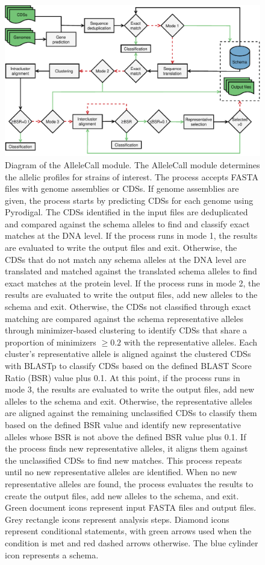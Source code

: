 \newpage
\begin{figure}[h!]
    \centering
    \includegraphics[angle=0,width=\textwidth]{figures/chapter 2/FigureS6.pdf}
    \caption{Diagram of the AlleleCall module. The AlleleCall module determines the allelic profiles for strains of interest. The process accepts FASTA files with genome assemblies or CDSs. If genome assemblies are given, the process starts by predicting CDSs for each genome using Pyrodigal. The CDSs identified in the input files are deduplicated and compared against the schema alleles to find and classify exact matches at the DNA level. If the process runs in mode 1, the results are evaluated to write the output files and exit. Otherwise, the CDSs that do not match any schema alleles at the DNA level are translated and matched against the translated schema alleles to find exact matches at the protein level. If the process runs in mode 2, the results are evaluated to write the output files, add new alleles to the schema and exit. Otherwise, the CDSs not classified through exact matching are compared against the schema representative alleles through minimizer-based clustering to identify CDSs that share a proportion of minimizers $\geq0.2$ with the representative alleles. Each cluster's representative allele is aligned against the clustered CDSs with BLASTp to classify CDSs based on the defined BLAST Score Ratio (BSR) value plus 0.1. At this point, if the process runs in mode 3, the results are evaluated to write the output files, add new alleles to the schema and exit. Otherwise, the representative alleles are aligned against the remaining unclassified CDSs to classify them based on the defined BSR value and identify new representative alleles whose BSR is not above the defined BSR value plus 0.1. If the process finds new representative alleles, it aligns them against the unclassified CDSs to find new matches. This process repeats until no new representative alleles are identified. When no new representative alleles are found, the process evaluates the results to create the output files, add new alleles to the schema, and exit. Green document icons represent input FASTA files and output files. Grey rectangle icons represent analysis steps. Diamond icons represent conditional statements, with green arrows used when the condition is met and red dashed arrows otherwise. The blue cylinder icon represents a schema.}
    \label{fig:chap2_figureS6}
\end{figure}

